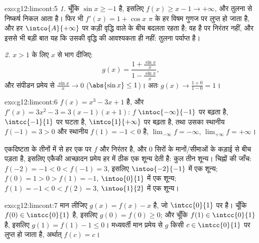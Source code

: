 \begin{solution}{exo:g12:limcont:5}
\emph{1.} चूँकि $\sin x \geq -1$ है, इसलिए $f(x) \geq x - 1 \to +\infty$, और तुलना से निष्कर्ष निकल आता है। फिर भी
$f'(x) = 1 + \cos x$ $\pi$ के हर विषम गुणज पर लुप्त हो जाता है, और हर  $\intco{A}{+\infty}$ पर  कड़ी
वृद्धि वाले  के बीच बदलता रहता है; वह  है पर निरंतर नहीं, और
इससे भी बड़ी बात यह कि उसकी वृद्धि की आवश्यकता ही नहीं: तुलना पर्याप्त है।

\emph{2.} $x > 1$ के लिए $x$ से भाग दीजिए:
\[
g(x) = \frac{1 + \frac{\sin x}{x}}{1 - \frac{\sin x}{x}},
\]
और संपीडन प्रमेय से $\frac{\sin x}{x} \to 0$ ($\abs{\sin x} \leq 1$)। अतः $g(x) \to \frac{1+0}{1-0} = 1$।
\end{solution}

\begin{solution}{exo:g12:limcont:6}
$f(x) = x^3 - 3x + 1$  है, और $f'(x) = 3x^2 - 3 = 3(x-1)(x+1)$: $f$ $\intoc{-\infty}{-1}$ पर बढ़ता है, $\intcc{-1}{1}$ पर घटता है, $\intco{1}{+\infty}$ पर बढ़ता
है, तथा उसका स्थानीय  $f(-1) = 3 > 0$ और स्थानीय  $f(1) = -1 < 0$ है, $\lim_{-\infty} f = -\infty$, $\lim_{+\infty} f = +\infty$।

एकदिष्टता के तीनों  में से हर एक पर $f$  और निरंतर  है,
और $0$ सिरों के मानों/सीमाओं के कड़ाई से बीच पड़ता है, इसलिए एकैकी आच्छादन
प्रमेय हर  में ठीक एक शून्य देती है: कुल तीन शून्य। चिह्नों की जाँच:
$f(-2) = -1 < 0 < f(-1) = 3$, इसलिए $\intoo{-2}{-1}$ में एक शून्य; $f(0) = 1 > 0 > f(1) = -1$, $\intoo{0}{1}$ में एक शून्य; $f(1) = -1 < 0 < f(2) = 3$, $\intoo{1}{2}$ में एक
शून्य।
\end{solution}

\begin{solution}{exo:g12:limcont:7}
मान लीजिए $g(x) = f(x) - x$ है, जो $\intcc{0}{1}$ पर  है। चूँकि $f(0) \in \intcc{0}{1}$ है, इसलिए $g(0) = f(0) \geq 0$; और चूँकि
$f(1) \in \intcc{0}{1}$ है, इसलिए $g(1) = f(1) - 1 \leq 0$। मध्यवर्ती मान प्रमेय से $g$ किसी $c \in \intcc{0}{1}$ पर लुप्त हो जाता
है, अर्थात् $f(c) = c$।
\end{solution}

